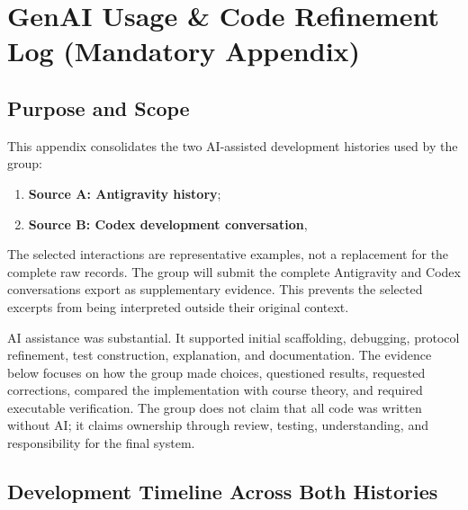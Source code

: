 % 
%
%

\section{GenAI Usage \& Code Refinement Log (Mandatory Appendix)}

\newcommand{\sourceA}{\textbf{Source A: Antigravity history}}
\newcommand{\sourceB}{\textbf{Source B: Codex development conversation}}

\subsection{Purpose and Scope}

This appendix consolidates the two AI-assisted development histories used by
the group:

\begin{enumerate}
  \item \sourceA;
  \item \sourceB, 
\end{enumerate}

The selected interactions are representative examples, not a replacement for
the complete raw records. The group will submit
the complete Antigravity and Codex conversations export as supplementary evidence. This
prevents the selected excerpts from being interpreted outside their original
context.

AI assistance was substantial. It supported initial scaffolding, debugging,
protocol refinement, test construction, explanation, and documentation. The
evidence below focuses on how the group made choices, questioned results,
requested corrections, compared the implementation with course theory, and
required executable verification. The group does not claim that all code was
written without AI; it claims ownership through review, testing,
understanding, and responsibility for the final system.

\subsection{Development Timeline Across Both Histories}

